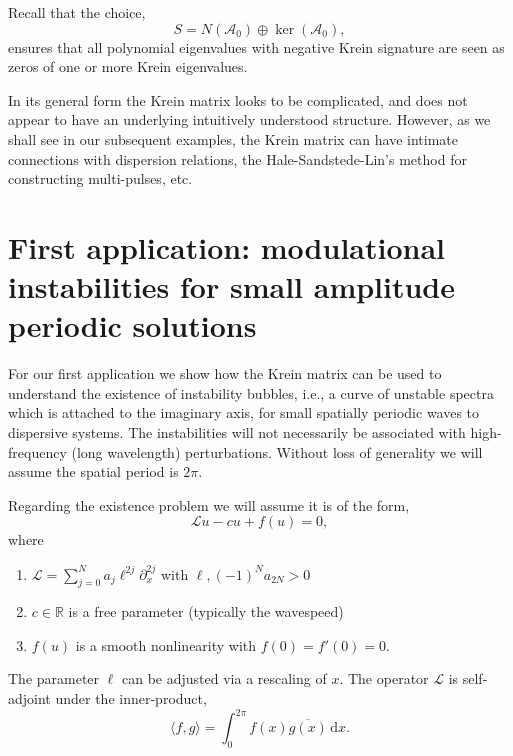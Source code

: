 \documentclass[review,onefignum,onetabnum]{siamart171218}
\newcommand{\R}{\mathbb{R}}
\def\ker{\mathop\mathrm{ker}\nolimits}
\newcommand{\rmd}{\mathrm{d}}
\newcommand{\calA}{\mathcal{A}}
\newcommand{\calL}{\mathcal{L}}
\begin{document}
\begin{remark}
Recall that the choice,
\[
S=N(\calA_0)\oplus\ker(\calA_0),
\]
ensures that all polynomial eigenvalues with negative Krein signature are seen as zeros of one or more Krein eigenvalues.
\end{remark}
%
%

In its general form the Krein matrix looks to be complicated, and does not appear to have an underlying intuitively understood structure.  However, as we shall see in our subsequent examples, the Krein matrix can have intimate connections with dispersion relations, the Hale-Sandstede-Lin's method for constructing multi-pulses, etc.

\section{First application: modulational instabilities for small amplitude periodic solutions}\label{s:4}

For our first application we show how the Krein matrix can be used to understand the existence of
instability bubbles, i.e., a curve of unstable spectra which is attached to the imaginary axis, for small spatially periodic waves to dispersive systems.
The instabilities will not necessarily be associated with high-frequency
(long wavelength) perturbations. Without loss of generality we will assume the spatial period is $2\pi$.

Regarding the existence problem we will assume it is of the form,
\begin{equation}\label{e:51}
\calL u-cu+f(u)=0,
\end{equation}
where
\begin{enumerate}
\item $\displaystyle{\calL=\sum_{j=0}^Na_j\ell^{2j}\partial_x^{2j}}$ with
    $\ell,(-1)^Na_{2N}>0$
\item $c\in\R$ is a free parameter (typically the wavespeed) 
\item $f(u)$ is a smooth nonlinearity with $f(0)=f'(0)=0$.
\end{enumerate}
The parameter $\ell$ can be adjusted via a rescaling of $x$.
The operator $\calL$ is self-adjoint under the inner-product,
\[
\langle f,g\rangle=\int_0^{2\pi}f(x)\overline{g(x)}\,\rmd x.
\]
\end{document}

